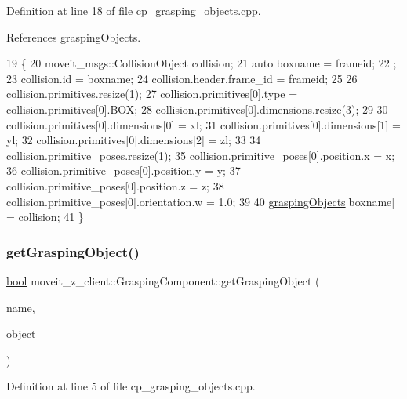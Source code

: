 Definition at line 18 of file cp\+\_\+grasping\+\_\+objects.\+cpp.



References grasping\+Objects.


\begin{DoxyCode}
19    \{
20       moveit\_msgs::CollisionObject collision;
21       \textcolor{keyword}{auto} boxname = frameid;
22       ;
23       collision.id = boxname;
24       collision.header.frame\_id = frameid;
25 
26       collision.primitives.resize(1);
27       collision.primitives[0].type = collision.primitives[0].BOX;
28       collision.primitives[0].dimensions.resize(3);
29 
30       collision.primitives[0].dimensions[0] = xl;
31       collision.primitives[0].dimensions[1] = yl;
32       collision.primitives[0].dimensions[2] = zl;
33 
34       collision.primitive\_poses.resize(1);
35       collision.primitive\_poses[0].position.x = x;
36       collision.primitive\_poses[0].position.y = y;
37       collision.primitive\_poses[0].position.z = z;
38       collision.primitive\_poses[0].orientation.w = 1.0;
39 
40       \hyperlink{classmoveit__z__client_1_1GraspingComponent_aca353c6a2eae807176c60bb9dfeea567}{graspingObjects}[boxname] = collision;
41    \}
\end{DoxyCode}
\mbox{\label{classmoveit__z__client_1_1GraspingComponent_a791e7cd29d7dcbb85012ea1c5827db22}} 
\subsubsection{\texorpdfstring{get\+Grasping\+Object()}{getGraspingObject()}}
{\footnotesize\ttfamily \hyperlink{classbool}{bool} moveit\+\_\+z\+\_\+client\+::\+Grasping\+Component\+::get\+Grasping\+Object (\begin{DoxyParamCaption}\item[{std\+::string}]{name,  }\item[{moveit\+\_\+msgs\+::\+Collision\+Object \&}]{object }\end{DoxyParamCaption})}



Definition at line 5 of file cp\+\_\+grasping\+\_\+objects.\+cpp.




